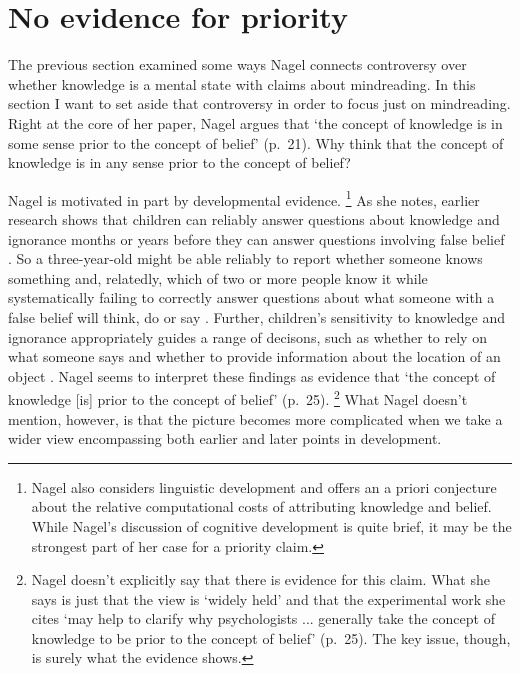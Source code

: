 \documentclass[11pt,a4paper]{extarticle}
\begin{document}




\section{No evidence for priority}
The previous section examined some ways  Nagel connects  controversy over whether knowledge is a mental state with claims about mindreading.
In this section I want to set aside that controversy in order to focus just on mindreading.
Right at the core of her paper, Nagel argues that  `the concept of knowledge is in some sense prior to the concept of belief' (p.\ 21). 
  Why think that the concept of knowledge is in any sense prior to the concept of belief?

Nagel is motivated in part by developmental evidence.%
\footnote{
Nagel also considers linguistic development and offers an a priori conjecture about the relative computational costs of attributing knowledge and belief.
While Nagel's discussion of cognitive development is quite brief, it may be the strongest part of her case for a priority claim.
}
As she notes, earlier research shows that
children can reliably answer questions about knowledge and ignorance months or years before they can answer questions involving false belief \citep{hogrefe_ignorance_1986}.
So a three-year-old might be able reliably to report whether someone knows something and, relatedly, which of two or more people know it while systematically failing to correctly answer questions about what someone with a false belief will think, do or say \citep{Wellman:2001lz}.
Further, children's sensitivity to knowledge and ignorance appropriately guides a range of decisons, 
such as whether to rely on what someone says \citep{Robinson:1999sq,Robinson:2003bh} 
and whether to provide information about the location of an object \citep{Dunham:2000tv,Liszkowski:2008al}.
Nagel seems to interpret these findings as evidence that `the concept of knowledge [is] prior to the concept of belief' (p.\ 25).%
\footnote{
Nagel doesn't explicitly say that there is evidence for this claim.
What she says is just that the view is `widely held' and that  the experimental work she cites `may help to clarify why psychologists ... generally take the concept of knowledge to be prior to the concept of belief' (p.\ 25).
The key issue, though, is surely what the evidence shows.
} 
What Nagel doesn't mention, however, is that the picture becomes more complicated when we take a wider view encompassing both earlier and later points in development.
\end{document}
